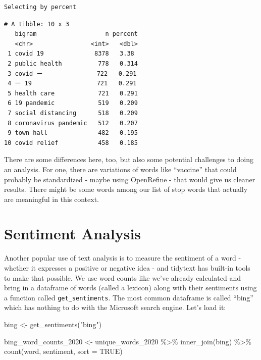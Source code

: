 \documentclass[
  letterpaper,
  DIV=11,
  numbers=noendperiod]{scrreprt}
\newenvironment{Shaded}{\begin{snugshade}}{\end{snugshade}}
\newcommand{\AttributeTok}[1]{\textcolor[rgb]{0.40,0.45,0.13}{#1}}
\newcommand{\ConstantTok}[1]{\textcolor[rgb]{0.56,0.35,0.01}{#1}}
\newcommand{\FunctionTok}[1]{\textcolor[rgb]{0.28,0.35,0.67}{#1}}
\newcommand{\NormalTok}[1]{\textcolor[rgb]{0.00,0.23,0.31}{#1}}
\newcommand{\OtherTok}[1]{\textcolor[rgb]{0.00,0.23,0.31}{#1}}
\newcommand{\SpecialCharTok}[1]{\textcolor[rgb]{0.37,0.37,0.37}{#1}}
\newcommand{\StringTok}[1]{\textcolor[rgb]{0.13,0.47,0.30}{#1}}
\begin{document}
\begin{verbatim}
Selecting by percent
\end{verbatim}

\begin{verbatim}
# A tibble: 10 x 3
   bigram                   n percent
   <chr>                <int>   <dbl>
 1 covid 19              8378   3.38 
 2 public health          778   0.314
 3 covid ー               722   0.291
 4 ー 19                  721   0.291
 5 health care            721   0.291
 6 19 pandemic            519   0.209
 7 social distancing      518   0.209
 8 coronavirus pandemic   512   0.207
 9 town hall              482   0.195
10 covid relief           458   0.185
\end{verbatim}

There are some differences here, too, but also some potential challenges
to doing an analysis. For one, there are variations of words like
``vaccine'' that could probably be standardized - maybe using OpenRefine
- that would give us cleaner results. There might be some words among
our list of stop words that actually are meaningful in this context.

\hypertarget{sentiment-analysis}{%
\section{Sentiment Analysis}\label{sentiment-analysis}}

Another popular use of text analysis is to measure the sentiment of a
word - whether it expresses a positive or negative idea - and tidytext
has built-in tools to make that possible. We use word counts like we've
already calculated and bring in a dataframe of words (called a lexicon)
along with their sentiments using a function called
\texttt{get\_sentiments}. The most common dataframe is called ``bing''
which has nothing to do with the Microsoft search engine. Let's load it:

\begin{Shaded}
\begin{Highlighting}[]
\NormalTok{bing }\OtherTok{\textless{}{-}} \FunctionTok{get\_sentiments}\NormalTok{(}\StringTok{"bing"}\NormalTok{)}

\NormalTok{bing\_word\_counts\_2020 }\OtherTok{\textless{}{-}}\NormalTok{ unique\_words\_2020 }\SpecialCharTok{\%\textgreater{}\%}
  \FunctionTok{inner\_join}\NormalTok{(bing) }\SpecialCharTok{\%\textgreater{}\%}
  \FunctionTok{count}\NormalTok{(word, sentiment, }\AttributeTok{sort =} \ConstantTok{TRUE}\NormalTok{)}
\end{Highlighting}
\end{Shaded}
\end{document}
